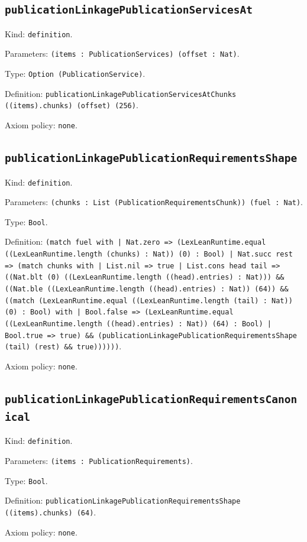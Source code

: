 \documentclass[11pt]{article}
\begin{document}
\subsection*{\texttt{publicationLinkagePublicationServicesAt}}
\noindent Kind: \texttt{definition}.\par
\noindent Parameters: \texttt{(items : PublicationServices) (offset : Nat)}.\par
\noindent Type: \texttt{Option (PublicationService)}.\par
\noindent Definition: \texttt{publicationLinkagePublicationServicesAtChunks ((items).chunks) (offset) (256)}.\par
\noindent Axiom policy: \texttt{none}.\par
\subsection*{\texttt{publicationLinkagePublicationRequirementsShape}}
\noindent Kind: \texttt{definition}.\par
\noindent Parameters: \texttt{(chunks : List (PublicationRequirementsChunk)) (fuel : Nat)}.\par
\noindent Type: \texttt{Bool}.\par
\noindent Definition: \texttt{(match fuel with | Nat.zero => (LexLeanRuntime.equal ((LexLeanRuntime.length (chunks) : Nat)) (0) : Bool) | Nat.succ rest => (match chunks with | List.nil => true | List.cons head tail => ((Nat.blt (0) ((LexLeanRuntime.length ((head).entries) : Nat))) \&\& ((Nat.ble ((LexLeanRuntime.length ((head).entries) : Nat)) (64)) \&\& ((match (LexLeanRuntime.equal ((LexLeanRuntime.length (tail) : Nat)) (0) : Bool) with | Bool.false => (LexLeanRuntime.equal ((LexLeanRuntime.length ((head).entries) : Nat)) (64) : Bool) | Bool.true => true) \&\& (publicationLinkagePublicationRequirementsShape (tail) (rest) \&\& true))))))}.\par
\noindent Axiom policy: \texttt{none}.\par
\subsection*{\texttt{publicationLinkagePublicationRequirementsCanonical}}
\noindent Kind: \texttt{definition}.\par
\noindent Parameters: \texttt{(items : PublicationRequirements)}.\par
\noindent Type: \texttt{Bool}.\par
\noindent Definition: \texttt{publicationLinkagePublicationRequirementsShape ((items).chunks) (64)}.\par
\noindent Axiom policy: \texttt{none}.\par
\end{document}
